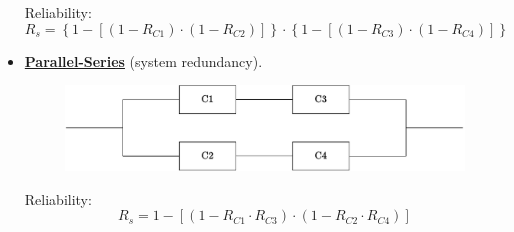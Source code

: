 \begin{itemize}
    Reliability:
    \begin{equation*}
        R_{s} = \left\{1 - \left[\left(1 - R_{C1}\right) \cdot \left(1 - R_{C2}\right)\right]\right\} \cdot \left\{1 - \left[\left(1 - R_{C3}\right) \cdot \left(1 - R_{C4}\right)\right]\right\}
    \end{equation*}


    \item \underline{\textbf{Parallel-Series}} (system redundancy).
    \begin{figure}[!htp]
        \centering
        \includegraphics[width=\textwidth]{img/RBD-4.pdf}
    \end{figure}

    Reliability:
    \begin{equation*}
        R_{s} = 1 - \left[\left(1 - R_{C1} \cdot R_{C3}\right) \cdot \left(1 - R_{C2} \cdot R_{C4}\right)\right]
    \end{equation*}
\end{itemize}

\newpage

